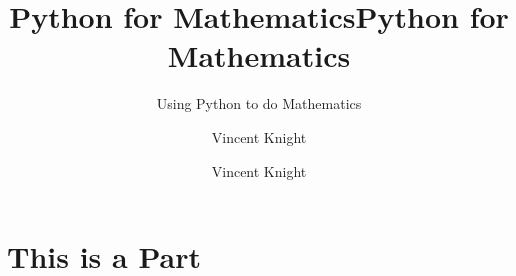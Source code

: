 \documentclass[Alon2,singlecolor,11pt]{Alon}%
\title{Python for Mathematics}
\author{Vincent Knight}
\begin{document}
\frontmatter





\title{Python for Mathematics} %
\subtitle{Using Python to do Mathematics}


\author{Vincent Knight}%


\maketitle


\cleardoublepage
\setcounter{page}{7} %

\listoffigures
\listoftables





\mainmatter

\part{This is a Part}


% 


% 
% 

\printindex
\cleardoublepage
\end{document}
